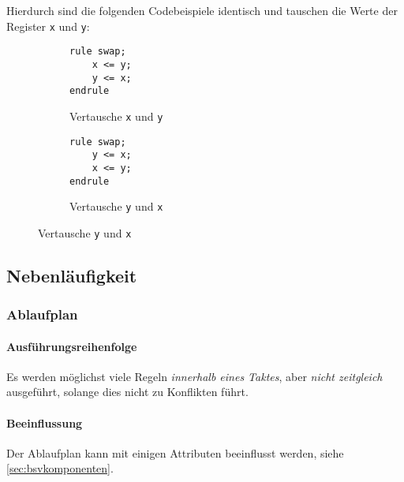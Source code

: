 			Hierdurch sind die folgenden Codebeispiele identisch und tauschen die Werte der Register \texttt{x} und \texttt{y}:
			\begin{figure}[ht]
				\centering
				\begin{subfigure}{0.4\textwidth}
					\begin{lstlisting}
rule swap;
	x <= y;
	y <= x;
endrule
					\end{lstlisting}
					\caption{Vertausche \texttt{x} und \texttt{y}}
				\end{subfigure}
				\begin{subfigure}{0.4\textwidth}
					\begin{lstlisting}
rule swap;
	y <= x;
	x <= y;
endrule
					\end{lstlisting}
					\caption{Vertausche \texttt{y} und \texttt{x}}
				\end{subfigure}
			\end{figure}
		
		\subsection{Nebenläufigkeit}
			\subsubsection{Ablaufplan}
				\paragraph{Ausführungsreihenfolge}
					Es werden möglichst viele Regeln \textit{innerhalb eines Taktes}, aber \textit{nicht zeitgleich} ausgeführt, solange dies nicht zu Konflikten führt.
				
				\paragraph{Beeinflussung}
					Der Ablaufplan kann mit einigen Attributen beeinflusst werden, siehe \ref{sec:bsvkomponenten}.
			
